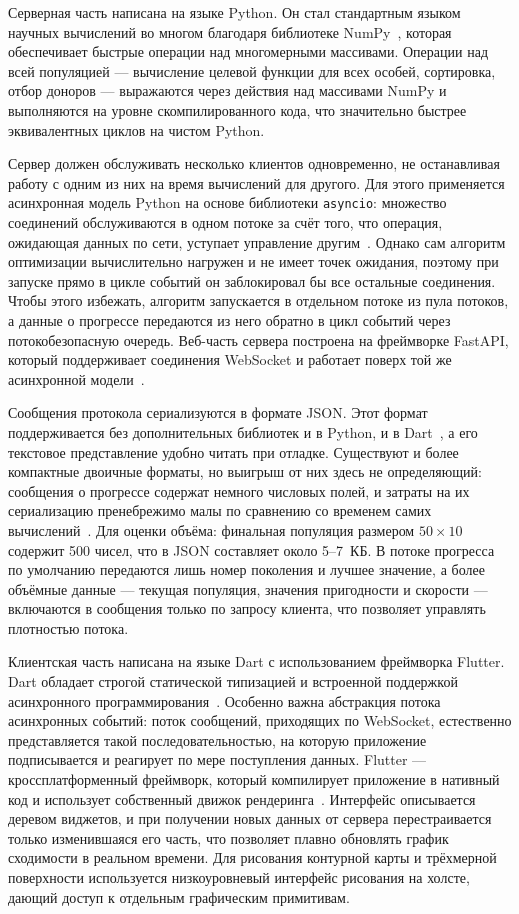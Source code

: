 \documentclass[14pt, a4paper]{extarticle}
\begin{document}
Серверная часть написана на языке Python. Он стал стандартным языком научных
вычислений во многом благодаря библиотеке NumPy~\cite{numpy2020}, которая обеспечивает быстрые
операции над многомерными массивами. Операции над всей
популяцией --- вычисление целевой функции для всех особей, сортировка, отбор
доноров --- выражаются через действия над массивами NumPy и выполняются на уровне
скомпилированного кода, что значительно быстрее эквивалентных циклов на чистом
Python.

Сервер должен обслуживать несколько клиентов одновременно, не останавливая работу
с одним из них на время вычислений для другого. Для этого применяется асинхронная
модель Python на основе библиотеки \texttt{asyncio}: множество соединений
обслуживаются в одном потоке за счёт того, что операция, ожидающая данных по сети,
уступает управление другим~\cite{yavorski2024}. Однако сам алгоритм оптимизации
вычислительно нагружен и не имеет точек ожидания, поэтому при запуске прямо в цикле
событий он заблокировал бы все остальные соединения. Чтобы этого избежать,
алгоритм запускается в отдельном потоке из пула потоков, а данные о прогрессе
передаются из него обратно в цикл событий через потокобезопасную очередь.
Веб-часть сервера построена на фреймворке FastAPI, который поддерживает соединения
WebSocket и работает поверх той же асинхронной модели~\cite{fastapi_docs}.

Сообщения протокола сериализуются в формате JSON. Этот формат поддерживается без
дополнительных библиотек и в Python, и в Dart~\cite{pythonjson, dartconvert}, а
его текстовое представление удобно читать при отладке. Существуют и более
компактные двоичные форматы, но выигрыш от них здесь не определяющий: сообщения о
прогрессе содержат немного числовых полей, и затраты на их сериализацию
пренебрежимо малы по сравнению со временем самих вычислений~\cite{shulman2021}.
Для оценки объёма: финальная популяция размером $50 \times 10$ содержит 500 чисел,
что в JSON составляет около 5--7~КБ. В потоке прогресса по умолчанию передаются лишь
номер поколения и лучшее значение, а более объёмные данные --- текущая популяция,
значения пригодности и скорости --- включаются в сообщения только по запросу
клиента, что позволяет управлять плотностью потока.

Клиентская часть написана на языке Dart с использованием фреймворка Flutter. Dart
обладает строгой статической типизацией и встроенной поддержкой асинхронного
программирования~\cite{ryabokon2013}. Особенно важна абстракция потока асинхронных
событий: поток сообщений, приходящих по WebSocket, естественно представляется
такой последовательностью, на которую приложение подписывается и реагирует по мере
поступления данных. Flutter --- кроссплатформенный фреймворк, который компилирует
приложение в нативный код и использует собственный движок
рендеринга~\cite{kamyshev2020}. Интерфейс описывается деревом виджетов, и при
получении новых данных от сервера перестраивается только изменившаяся его часть,
что позволяет плавно обновлять график сходимости в реальном времени. Для рисования
контурной карты и трёхмерной поверхности используется низкоуровневый интерфейс
рисования на холсте, дающий доступ к отдельным графическим примитивам.
\end{document}
